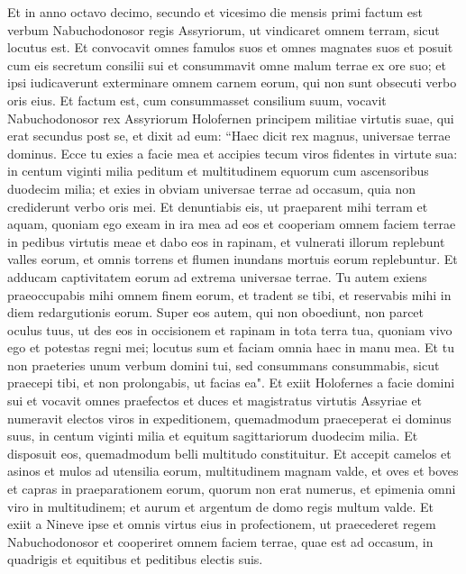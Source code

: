 \begin{biblechapter}  
\verse Et in anno octavo decimo, secundo et vicesimo die mensis primi factum est verbum Nabuchodonosor regis Assyriorum, ut vindicaret omnem terram, sicut locutus est. 
\verse Et convocavit omnes famulos suos et omnes magnates suos et posuit cum eis secretum consilii sui et consummavit omne malum terrae ex ore suo; 
\verse et ipsi iudicaverunt exterminare omnem carnem eorum, qui non sunt obsecuti verbo oris eius. 
\verse Et factum est, cum consummasset consilium suum, vocavit Nabuchodonosor rex Assyriorum Holofernen principem militiae virtutis suae, qui erat secundus post se, 
\verse et dixit ad eum: “Haec dicit rex magnus, universae terrae dominus. Ecce tu exies a facie mea et accipies tecum viros fidentes in virtute sua: in centum viginti milia peditum et multitudinem equorum cum ascensoribus duodecim milia; 
\verse et exies in obviam universae terrae ad occasum, quia non crediderunt verbo oris mei. 
\verse Et denuntiabis eis, ut praeparent mihi terram et aquam, quoniam ego exeam in ira mea ad eos et cooperiam omnem faciem terrae in pedibus virtutis meae et dabo eos in rapinam,  
\verse et vulnerati illorum replebunt valles eorum, et omnis torrens et flumen inundans mortuis eorum replebuntur. 
\verse Et adducam captivitatem eorum ad extrema universae terrae. 
\verse Tu autem exiens praeoccupabis mihi omnem finem eorum, et tradent se tibi, et reservabis mihi in diem redargutionis eorum.  
\verse Super eos autem, qui non oboediunt, non parcet oculus tuus, ut des eos in occisionem et rapinam in tota terra tua, 
\verse quoniam vivo ego et potestas regni mei; locutus sum et faciam omnia haec in manu mea. 
\verse Et tu non praeteries unum verbum domini tui, sed consummans consummabis, sicut praecepi tibi, et non prolongabis, ut facias ea". 
\verse Et exiit Holofernes a facie domini sui et vocavit omnes praefectos et duces et magistratus virtutis Assyriae  
\verse et numeravit electos viros in expeditionem, quemadmodum praeceperat ei dominus suus, in centum viginti milia et equitum sagittariorum duodecim milia. 
\verse Et disposuit eos, quemadmodum belli multitudo constituitur. 
\verse Et accepit camelos et asinos et mulos ad utensilia eorum, multitudinem magnam valde, et oves et boves et capras in praeparationem eorum, quorum non erat numerus, 
\verse et epimenia omni viro in multitudinem; et aurum et argentum de domo regis multum valde. 
\verse Et exiit a Nineve ipse et omnis virtus eius in profectionem, ut praecederet regem Nabuchodonosor et cooperiret omnem faciem terrae, quae est ad occasum, in quadrigis et equitibus et peditibus electis suis. 

\end{biblechapter}
